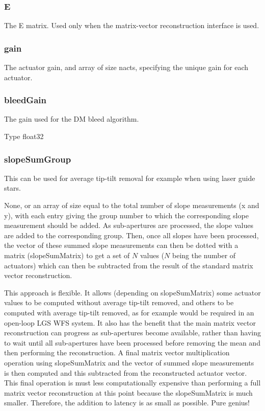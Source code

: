 \documentclass[a4,10pt]{article}
\begin{document}
\subsubsection{E}
The E matrix.  Used only when the
matrix-vector reconstruction interface is used.

\subsubsection{gain}
The actuator gain, and array of size nacts, specifying the unique gain for
each actuator.  

\subsubsection{bleedGain}
The gain used for the DM bleed algorithm.

Type float32

\subsubsection{slopeSumGroup}
This can be used for average tip-tilt removal for example when using
laser guide stars.

None, or an array of size equal to the total number of slope
measurements (x and y), with each entry giving the group number to
which the corresponding slope measurement should be added.  As
sub-apertures are processed, the slope values are added to the
corresponding group.  Then, once all slopes have been processed, the
vector of these summed slope measurements can then be dotted with a
matrix (slopeSumMatrix) to get a set of $N$ values ($N$ being the
number of actuators) which can then be subtracted from the result of
the standard matrix vector reconstruction.

This approach is flexible.  It allows (depending on slopeSumMatrix)
some actuator values to be computed without average tip-tilt removed,
and others to be computed with average tip-tilt removed, as for
example would be required in an open-loop LGS WFS system.  It also has
the benefit that the main matrix vector reconstruction can progress as
sub-apertures become available, rather than having to wait until all
sub-apertures have been processed before removing the mean and then
performing the reconstruction.  A final matrix vector multiplication
operation using slopeSumMatrix and the vector of summed slope
measurements is then computed and this subtracted from the
reconstructed actuator vector.  This final operation is must less
computationally expensive than performing a full matrix vector
reconstruction at this point because the slopeSumMatrix is much
smaller.  Therefore, the addition to latency is as small as possible.
Pure genius!
\end{document}
